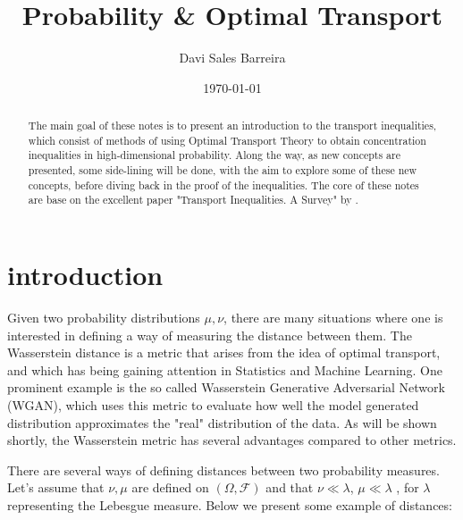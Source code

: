 \documentclass[10pt]{article}
\title{Probability \& Optimal Transport}
\author{Davi Sales Barreira}
\date{\today}
\theoremstyle{definition}
\begin{document}
\maketitle \tableofcontents 


\begin{abstract}
The main goal of these notes is to present an introduction to the transport inequalities,
which consist of methods of using Optimal Transport Theory to obtain concentration
inequalities in high-dimensional probability. Along the way, as new concepts are presented,
some side-lining will be done, with the aim to explore some of these new concepts, before
diving back in the proof of the inequalities. The core of these notes are base on the
excellent paper "Transport Inequalities. A Survey" by \cite{gozlan2010transport}.
\end{abstract}


\section{introduction}
Given two probability distributions $\mu,\nu$, there are many situations
where one is interested in defining a way of measuring the
distance between them. The Wasserstein distance is a
metric that arises from the idea of optimal transport, and which has being
gaining attention in Statistics and Machine Learning. One prominent example is the so
called Wasserstein Generative Adversarial Network (WGAN), which uses this metric to evaluate
how well the model generated distribution approximates the "real" distribution of the
data. As will be shown shortly, the Wasserstein metric has several advantages compared to
other metrics.

There are several ways of defining distances between two
probability measures. Let's assume that $\nu, \mu$ are defined on 
$(\Omega, \mathcal F)$ and that $\nu \ll \lambda$,
$\mu \ll \lambda$ , for $\lambda$ representing the Lebesgue measure. Below
we present some example of distances:
\end{document}
